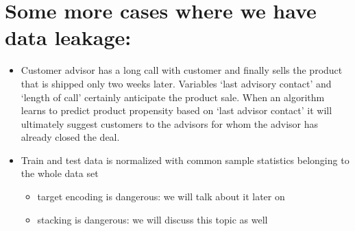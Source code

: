 \documentclass[letterpaper,10pt,english]{jupyterBook}
\begin{document}
\section{Some more cases where we have data leakage:}
\label{\detokenize{dependent_data:some-more-cases-where-we-have-data-leakage}}\begin{itemize}
\item {} 
\sphinxAtStartPar
Customer advisor has a long call with customer and finally sells the product that is shipped only two weeks later. Variables ‘last advisory contact’ and ‘length of call’ certainly anticipate the product sale. When an algorithm learns to predict product propensity based on ‘last advisor contact’ it will ultimately suggest customers to the advisors for whom the advisor has already closed the deal.

\item {} 
\sphinxAtStartPar
Train and test data is normalized with common sample statistics belonging to the whole data set
\begin{itemize}
\item {} 
\sphinxAtStartPar
target encoding is dangerous: we will talk about it later on

\item {} 
\sphinxAtStartPar
stacking is dangerous: we will discuss this topic as well

\end{itemize}

\end{itemize}
\end{document}
